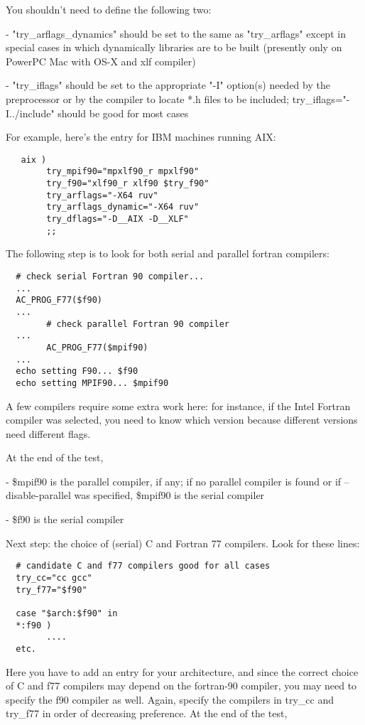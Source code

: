 \documentclass[12pt,a4paper]{article}
\begin{document}
\begin{enumerate}
You shouldn't need to define the following two:

- "try\_arflags\_dynamics" should be set to the same as "try\_arflags"
except in special cases in which dynamically libraries are to be
built (presently only on PowerPC Mac with OS-X and xlf compiler)

- "try\_iflags" should be set to the appropriate "-I" option(s)
needed by the preprocessor or by the compiler to locate *.h files
to be included; try\_iflags="-I../include" should be good for most cases

For example, here's the entry for IBM machines running AIX:
\begin{verbatim}
   aix )
        try_mpif90="mpxlf90_r mpxlf90"
        try_f90="xlf90_r xlf90 $try_f90"
        try_arflags="-X64 ruv"
        try_arflags_dynamic="-X64 ruv"
        try_dflags="-D__AIX -D__XLF"
        ;;
\end{verbatim}
The following step is to look for both serial and parallel fortran
compilers:
\begin{verbatim}
  # check serial Fortran 90 compiler...
  ...
  AC_PROG_F77($f90)
  ...
        # check parallel Fortran 90 compiler
  ...
        AC_PROG_F77($mpif90)
  ...
  echo setting F90... $f90
  echo setting MPIF90... $mpif90
\end{verbatim}
A few compilers require some extra work here: for instance, if the
Intel Fortran compiler was selected, you need to know which version
because different versions need different flags.

At the end of the test,
 
- \$mpif90 is the parallel compiler, if any; if no parallel compiler is found or if --disable-parallel was specified, \$mpif90 is the serial compiler

- \$f90 is the serial compiler

Next step: the choice of (serial) C and Fortran 77 compilers.
Look for these lines:
\begin{verbatim}
  # candidate C and f77 compilers good for all cases
  try_cc="cc gcc"
  try_f77="$f90"

  case "$arch:$f90" in
  *:f90 )
        ....
  etc.
\end{verbatim}
Here you have to add an entry for your architecture, and since the 
correct choice of C and f77 compilers may depend on the fortran-90 
compiler, you may need to specify the f90 compiler as well.
Again, specify the compilers in try\_cc and try\_f77 in order of 
decreasing preference.  At the end of the test, 


\end{enumerate}
\end{document}
